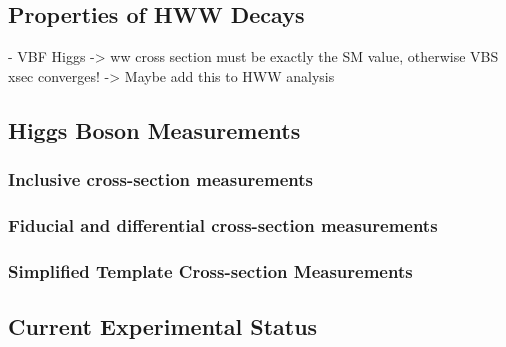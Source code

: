 \subsection{Properties of HWW Decays}
- VBF Higgs -> ww cross section must be exactly the SM value, otherwise VBS xsec converges!
-> Maybe add this to HWW analysis



\subsection{Higgs Boson Measurements}

\subsubsection{Inclusive cross-section measurements}
\subsubsection{Fiducial and differential cross-section measurements}
\subsubsection{Simplified Template Cross-section Measurements}

\subsection{Current Experimental Status}
